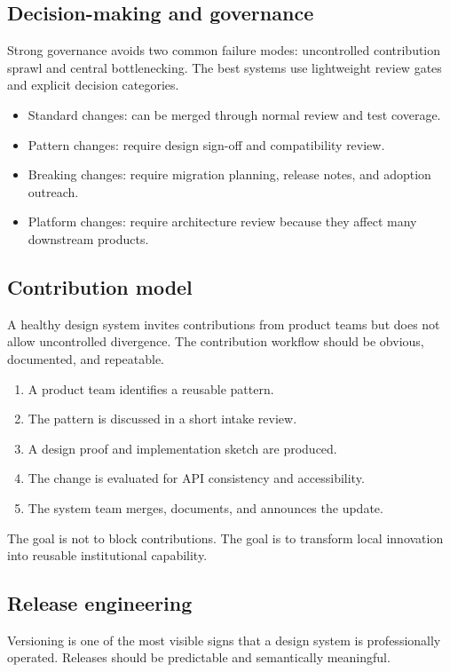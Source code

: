 \subsection{Decision-making and governance}
Strong governance avoids two common failure modes: uncontrolled contribution sprawl and central bottlenecking. The best systems use lightweight review gates and explicit decision categories.

\begin{itemize}[leftmargin=*, itemsep=0.35em]
  \item Standard changes: can be merged through normal review and test coverage.
  \item Pattern changes: require design sign-off and compatibility review.
  \item Breaking changes: require migration planning, release notes, and adoption outreach.
  \item Platform changes: require architecture review because they affect many downstream products.
\end{itemize}

\subsection{Contribution model}
A healthy design system invites contributions from product teams but does not allow uncontrolled divergence. The contribution workflow should be obvious, documented, and repeatable.

\begin{enumerate}[leftmargin=*, itemsep=0.3em]
  \item A product team identifies a reusable pattern.
  \item The pattern is discussed in a short intake review.
  \item A design proof and implementation sketch are produced.
  \item The change is evaluated for API consistency and accessibility.
  \item The system team merges, documents, and announces the update.
\end{enumerate}

The goal is not to block contributions. The goal is to transform local innovation into reusable institutional capability.

\subsection{Release engineering}
Versioning is one of the most visible signs that a design system is professionally operated. Releases should be predictable and semantically meaningful.

